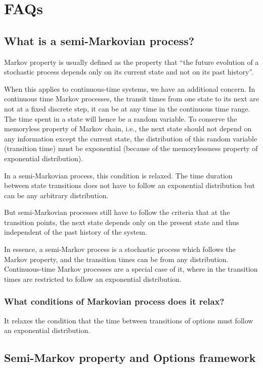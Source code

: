 \section{FAQs}

\subsection{What is a semi-Markovian process?}

Markov property is usually defined as the property that ``the future evolution of a stochastic process depends only on its current state and not on its past history''.

When this applies to continuous-time systems, we have an additional concern.
In continuous time Markov processes, the transit times from one state to its next are not at a fixed discrete step, it can be at any time in the continuous time range.
The time spent in a state will hence be a random variable.
To conserve the memoryless property of Markov chain, i.e., the next state should not depend on any information except the current state, the distribution of this random variable (transition time) must be exponential (because of the memorylessness property of exponential distribution).

In a semi-Markovian process, this condition is relaxed.
The time duration between state transitions does not have to follow an exponential distribution but can be any arbitrary distribution.

But semi-Markovian processes still have to follow the criteria that at the transition points, the next state depends only on the present state and thus independent of the past history of the system.

In essence, a semi-Markov process is a stochastic process which follows the Markov property, and the transition times can be from any distribution.
Continuous-time Markov processes are a special case of it, where in the transition times are restricted to follow an exponential distribution.

\subsubsection{What conditions of Markovian process does it relax?}

It relaxes the condition that the time between transitions of options must follow an exponential distribution.

\subsection{Semi-Markov property and Options framework}

